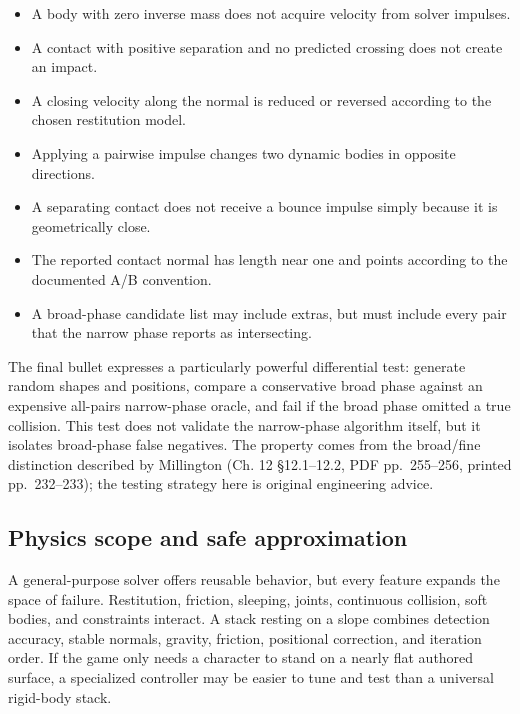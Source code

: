 \begin{itemize}
\tightlist
\item
  A body with zero inverse mass does not acquire velocity from solver impulses.
\item
  A contact with positive separation and no predicted crossing does not create an impact.
\item
  A closing velocity along the normal is reduced or reversed according to the chosen restitution model.
\item
  Applying a pairwise impulse changes two dynamic bodies in opposite directions.
\item
  A separating contact does not receive a bounce impulse simply because it is geometrically close.
\item
  The reported contact normal has length near one and points according to the documented A/B convention.
\item
  A broad-phase candidate list may include extras, but must include every pair that the narrow phase reports as intersecting.
\end{itemize}

The final bullet expresses a particularly powerful differential test: generate random shapes and positions, compare a conservative broad phase against an expensive all-pairs narrow-phase oracle, and fail if the broad phase omitted a true collision. This test does not validate the narrow-phase algorithm itself, but it isolates broad-phase false negatives. The property comes from the broad/fine distinction described by Millington (Ch. 12 §12.1--12.2, PDF pp.~255--256, printed pp.~232--233); the testing strategy here is original engineering advice.

\subsection{Physics scope and safe approximation}\label{06-engine-ii-ch033-physics-scope-and-safe-approximation}

A general-purpose solver offers reusable behavior, but every feature expands the space of failure. Restitution, friction, sleeping, joints, continuous collision, soft bodies, and constraints interact. A stack resting on a slope combines detection accuracy, stable normals, gravity, friction, positional correction, and iteration order. If the game only needs a character to stand on a nearly flat authored surface, a specialized controller may be easier to tune and test than a universal rigid-body stack.

